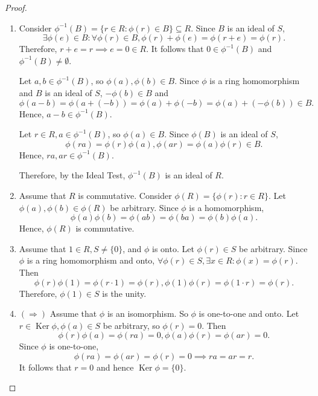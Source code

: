 \documentclass{article}
\theoremstyle{definition}
\DeclareMathOperator{\Ker}{Ker}
\begin{document}
\begin{proof}
\begin{enumerate}
         \item Consider $\phi^{-1}(B)=\{r\in R:\phi(r)\in B\}\subseteq R$. Since $B$ is an ideal of $S$,
         \begin{equation*}
            \exists \phi(e) \in B: \forall \phi(r)\in B, \phi(r)+\phi(e)=\phi(r+e)=\phi(r).
         \end{equation*}
         Therefore, $r+e=r \implies e=0\in R$. It follows that $0\in \phi^{-1}(B)$ and $\phi^{-1}(B)\neq\emptyset$. 
         
         Let $a,b\in\phi^{-1}(B)$, so $\phi(a),\phi(b)\in B$. Since $\phi$ is a ring homomorphism and $B$ is an ideal of $S$, $-\phi(b)\in B$ and 
         \begin{equation*}
             \phi(a-b)=\phi(a+(-b))=\phi(a)+\phi(-b)=\phi(a)+(-\phi(b))\in B.
         \end{equation*}
         Hence, $a-b\in\phi^{-1}(B)$. 
         
         Let $r\in R,a\in\phi^{-1}(B)$, so $\phi(a)\in B$. Since $\phi(B)$ is an ideal of $S$,
         \begin{equation*}
             \phi(ra)=\phi(r)\phi(a), \phi(ar)=\phi(a)\phi(r)\in B.
         \end{equation*}
         Hence, $ra,ar\in \phi^{-1}(B)$. 
         
         Therefore, by the Ideal Test, $\phi^{-1}(B)$ is an ideal of $R$.
         
         \item Assume that $R$ is commutative. Consider $\phi(R)=\{\phi(r):r\in R\}$. Let $\phi(a),\phi(b)\in\phi(R)$ be arbitrary. Since $\phi$ is a homomorphism, 
         \begin{equation*}
             \phi(a)\phi(b)=\phi(ab)=\phi(ba)=\phi(b)\phi(a).
         \end{equation*}
         Hence, $\phi(R)$ is commutative. 
         
         \item Assume that $1\in R, S\neq\{0\}$, and $\phi$ is onto. Let $\phi(r)\in S$ be arbitrary. Since $\phi$ is a ring homomorphism and onto, $\forall\phi(r)\in S, \exists x \in R: \phi(x)=\phi(r)$. Then
         \begin{equation*}
             \phi(r)\phi(1)=\phi(r\cdot1)=\phi(r), \phi(1)\phi(r)=\phi(1\cdot r)=\phi(r).
         \end{equation*}
         Therefore, $\phi(1)\in S$ is the unity. 
         
         \item $(\Rightarrow)$ Assume that $\phi$ is an isomorphism. So $\phi$ is one-to-one and onto. Let $r\in\Ker\phi, \phi(a)\in S$ be arbitrary, so $\phi(r)=0$. Then
         \begin{equation*}
             \phi(r)\phi(a)=\phi(ra)=0, \phi(a)\phi(r)=\phi(ar)=0.
         \end{equation*}
         Since $\phi$ is one-to-one,
         \begin{equation*}
             \phi(ra)=\phi(ar)=\phi(r)=0 \implies ra=ar=r.
         \end{equation*}
         It follows that $r=0$ and hence $\Ker\phi=\{0\}$.
         

\end{enumerate}
\end{proof}
\end{document}
